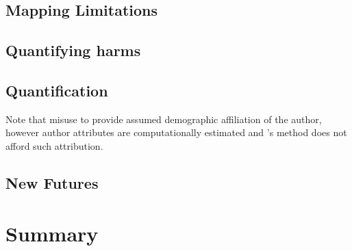 \subsection{Mapping Limitations}

\cite{Mitchell:2019}
\cite{Bender-Friedman:2018}
\cite{Hovy-Spruit:2016}
\cite{Blodget:2020}
\cite{Holstein:2019}

\subsection{Quantifying harms}
\cite{Buolamwini:2018}
\cite{Kulynych:2020}
\cite{Shah:2020}
\cite{Vanmassenhove:2018}
\cite{Waseem:2016}
\cite{Derzynski:2016}
\cite{Birhane:2020}

\subsection{Quantification}
\cite{Agarwal:2018}
\cite{Romanov:2019}
Note that \cite{Sap:2019} misuse \cite{Blodgett:2016} to provide assumed demographic affiliation of the author, however author attributes are computationally estimated and \cite{Blodgett:2016}'s method does not afford such attribution.
\cite{Davidson:2019}
\cite{Zhao:2017}

\subsection{New Futures}

\cite{Yimam-Biemann:2018}
\cite{Bingel:2018}
\cite{Kalluri:2019}

\section{Summary}

